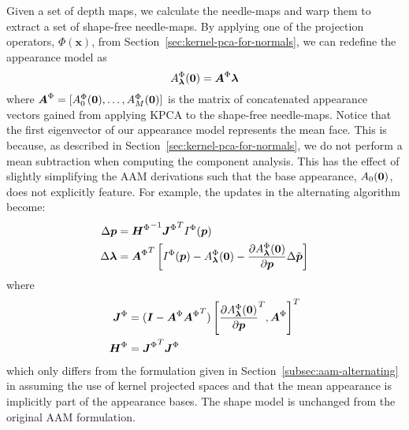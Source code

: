 Given a set of depth maps, we calculate the needle-maps and warp them to extract a set of shape-free needle-maps. By applying one of the projection operators, $\Phi(\boldsymbol{x})$, from Section~\ref{sec:kernel-pca-for-normals}, we can redefine the appearance model as
\begin{equation}\label{eq:aam-kernel-appearance-model}
    A_{\blambda}^{\Phi}(\zero) = \boldsymbol{A}^{\Phi} \blambda
\end{equation}
where $\boldsymbol{A}^{\Phi} = [A_0^{\Phi}(\boldsymbol{0}), \ldots, A_M^{\Phi}(\boldsymbol{0})]$ is the matrix of concatenated appearance vectors gained from applying KPCA to the shape-free needle-maps. Notice that the first eigenvector of our appearance model represents the mean face. This is because, as described in Section~\ref{sec:kernel-pca-for-normals}, we do not perform a mean subtraction when computing the component analysis. This has the effect of slightly simplifying the AAM derivations such that the base appearance, $A_0(\boldsymbol{0})$, does not explicitly feature. For example, the updates in the alternating algorithm become:
\begin{equation}
    \begin{aligned}\label{eq:aam-kernel-alternating-update}
        \Delta \p       &= {\boldsymbol{H}^{\Phi}}^{-1} {\boldsymbol{J}^{\Phi}}^{T} I^{\Phi}(\p) \\
        \Delta \blambda &= {\boldsymbol{A}^{\Phi}}^T \left[ I^{\Phi}(\p) - A^{\Phi}_{\blambda}(\zero) - \frac{\partial A^{\Phi}_{\blambda}(\zero)}{\partial \p} \Delta \tilde{\p} \right]
    \end{aligned}
\end{equation}
where 
\begin{equation*}
    \begin{aligned}
        \boldsymbol{J}^{\Phi} &= (\boldsymbol{I} - \boldsymbol{A}^{\Phi} {\boldsymbol{A}^{\Phi}}^T) \left[ {\frac{\partial A^{\Phi}_{\boldsymbol{\lambda}}(\boldsymbol{0})}{\partial \boldsymbol{p}}}^T, \boldsymbol{A}^{\Phi} \right]^T \\
        \boldsymbol{H}^{\Phi} &= {\boldsymbol{J}^{\Phi}}^{T} \boldsymbol{J}^{\Phi}
    \end{aligned}
\end{equation*}
which only differs from the formulation given in Section~\ref{subsec:aam-alternating} in assuming the use of kernel projected spaces and that the mean appearance is implicitly part of the appearance bases. The shape model is unchanged from the original AAM formulation.